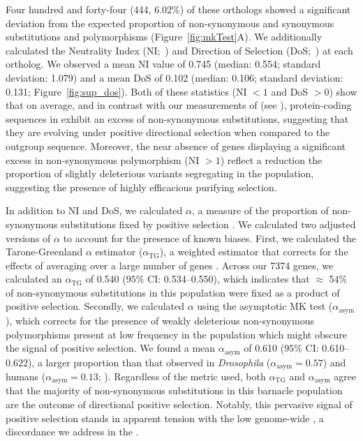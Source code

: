 Four hundred and forty-four (444, 6.02\%) of these orthologs showed a significant
deviation from the expected proportion of non-synonymous and synonymous substitutions
and polymorphisms (Figure~\ref{fig:mkTest}A).
We additionally calculated the Neutrality Index (NI;~\citealp{rand_excess_1996}) and
Direction of Selection (DoS;~\citealp{stoletzki_estimation_2011}) at each ortholog.
We observed a mean NI value of 0.745 (median: 0.554; standard deviation: 1.079) and
a mean DoS of 0.102 (median: 0.106; standard deviation: 0.131; Figure~\ref{fig:sup_dos}).
Both of these statistics (NI $<1$ and DoS $>0$) show that on average, and in contrast
with our measurements of \dnds{} (see ), protein-coding
sequences in \bgla{} exhibit an excess of non-synonymous substitutions, suggesting that
they are evolving under positive directional selection when compared to the outgroup sequence.
Moreover, the near absence of genes displaying a significant excess in non-synonymous
polymorphism (NI $>1$) reflect a reduction the proportion of slightly deleterious
variants segregating in the population, suggesting the presence of highly efficacious
purifying selection.
\vspace{0.1cm}

In addition to NI and DoS, we calculated $\alpha$, a measure of the proportion
of non-synonymous substitutions fixed by positive selection \citep{smith_adaptive_2002}.
We calculated two adjusted versions of $\alpha$ to account for the presence of known
biases.
First, we calculated the Tarone-Greenland $\alpha$ estimator ($\alpha_\text{TG}$), a
weighted estimator that corrects for the effects of averaging over a large number of
genes \citep{stoletzki_estimation_2011}.
Across our \num{7374} genes, we calculated an $\alpha_\text{TG}$ of 0.540 ($95\%$ CI:
0.534--0.550), which indicates that $\approx$ 54\% of non-synonymous substitutions in
this \bgla{} population were fixed as a product of positive selection.
Secondly, we calculated $\alpha$ using the asymptotic MK test ($\alpha_\text{asym}$),
which corrects for the presence of weakly deleterious non-synonymous polymorphisms
present at low frequency in the population \citep{messer_frequent_2013} which might
obscure the signal of positive selection.
We found a mean $\alpha_\text{asym}$ of 0.610 ($95\%$ CI: 0.610--0.622), a
larger proportion than that observed in \textit{Drosophila} ($\alpha_\text{asym} = 0.57$)
and humans ($\alpha_\text{asym} = 0.13$; \citealp{haller_asymptoticmk_2017,messer_frequent_2013}).
Regardless of the metric used, both $\alpha_\text{TG}$ and $\alpha_\text{asym}$ agree
that the majority of non-synonymous substitutions in this barnacle population are the
outcome of directional positive selection.
Notably, this pervasive signal of positive selection stands in apparent tension with
the low genome-wide \dnds{}, a discordance we address in the .
\vspace{0.1cm}

